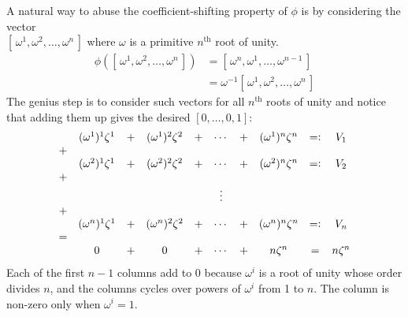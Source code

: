 \documentclass{article}
\renewcommand\({\left(}
\renewcommand\){\right)}
\begin{document}
\vspace{6mm}
A natural way to abuse the coefficient-shifting property of $\phi$ is by considering the vector\\ $[\,\omega^1,\omega^2,\ldots,\omega^n\,]$ where $\omega$ is a primitive $n^\text{th}$ root of unity.
\begin{align*}
    \phi\left([\,\omega^1,\omega^2,\ldots,\omega^n\,]\right)&=[\,\omega^n,\omega^1,\ldots,\omega^{n-1}\,]\\
    &=\omega^{-1}[\,\omega^1,\omega^2,\ldots,\omega^n\,]
\end{align*}
The genius step is to consider such vectors for all $n^\text{th}$ roots of unity and notice that adding them up gives the desired $[0,\dots,0,1]$:
\begin{align}
    \begin{array}{cccccccccc}
        &(\omega^1)^1\zeta^1&+&(\omega^1)^2\zeta^2&+&\cdots&+&(\omega^1)^n\zeta^n&=\vcentcolon&V_1\\
        +\\
        &(\omega^2)^1\zeta^1&+&(\omega^2)^2\zeta^2&+&\cdots&+&(\omega^2)^n\zeta^n&=\vcentcolon&V_2\\
        +\\
        &&&&&\vdots&&\\
        +\\
        &(\omega^n)^1\zeta^1&+&(\omega^n)^2\zeta^2&+&\cdots&+&(\omega^n)^n\zeta^n&=\vcentcolon&V_n\\
        =\\
        &0&+&0&+&\cdots&+&n\zeta^n&=&n\zeta^n
    \end{array}
\end{align}
Each of the first $n-1$ columns add to $0$ because $\omega^i$ is a root of unity whose order divides $n$, and the columns cycles over powers of $\omega^i$ from 1 to $n$. The column is non-zero only when $\omega^i=1$.
\end{document}
